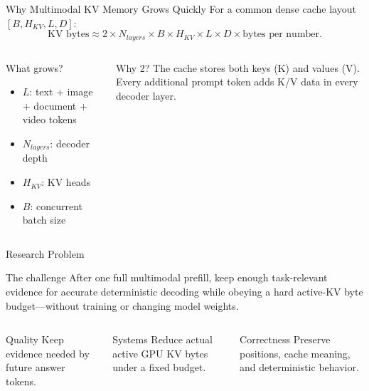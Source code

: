 \documentclass[aspectratio=169,10pt]{beamer}
\newcommand{\tightitems}{\setlength{\itemsep}{0.28em}\setlength{\parskip}{0pt}}
\begin{document}
\begin{frame}{Why Multimodal KV Memory Grows Quickly}
\small
For a common dense cache layout $[B,H_{KV},L,D]$:
\[
\text{KV bytes}\approx
2\times N_{layers}\times B\times H_{KV}\times L\times D
\times \text{bytes per number}.
\]
\begin{columns}[T,onlytextwidth]
\begin{block}{What grows?}
\begin{itemize}\tightitems
  \item $L$: text + image + document + video tokens
  \item $N_{layers}$: decoder depth
  \item $H_{KV}$: KV heads
  \item $B$: concurrent batch size
\end{itemize}
\end{block}
\begin{alertblock}{Why 2?}
The cache stores both keys (K) and values (V). Every additional prompt token adds K/V data in
every decoder layer.
\end{alertblock}
\end{columns}
\end{frame}

\begin{frame}{Research Problem}
\large
\begin{center}
\begin{minipage}{0.90\textwidth}
\begin{block}{The challenge}
After one full multimodal prefill, keep enough task-relevant evidence for accurate deterministic
decoding while obeying a hard active-KV byte budget---without training or changing model weights.
\end{block}
\end{minipage}
\end{center}
\vspace{0.5em}
\small
\begin{columns}[T,onlytextwidth]
\begin{exampleblock}{Quality}
Keep evidence needed by future answer tokens.
\end{exampleblock}
\begin{exampleblock}{Systems}
Reduce actual active GPU KV bytes under a fixed budget.
\end{exampleblock}
\begin{exampleblock}{Correctness}
Preserve positions, cache meaning, and deterministic behavior.
\end{exampleblock}
\end{columns}
\end{frame}
\end{document}
